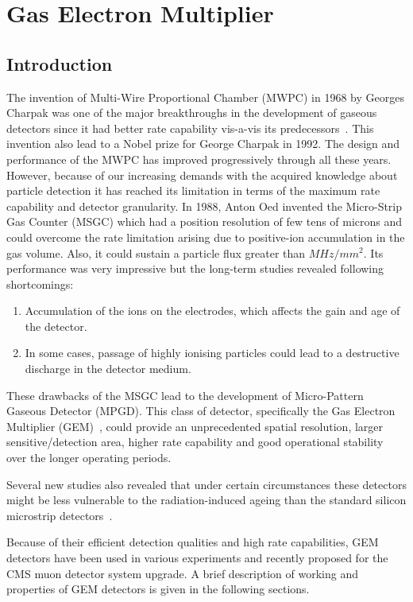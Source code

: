 \chapter{Gas Electron Multiplier} %
\label{cha:gas_electron_multiplier}

\section{Introduction} %
\label{sec:introduction}
The invention of Multi-Wire Proportional Chamber (MWPC) in 1968 by Georges Charpak was one of the major breakthroughs in the development of gaseous detectors since it had better rate capability vis-a-vis its predecessors~\cite{Charpak1968}. 
This invention also lead to a Nobel prize for George Charpak in 1992. 
The design and performance of the MWPC has improved progressively through all these years.
However, because of our increasing demands with the acquired knowledge about particle detection it has reached its limitation in terms of the maximum rate capability and detector granularity.
In 1988, Anton Oed invented the Micro-Strip Gas Counter (MSGC) which had a position resolution of few tens of microns and could overcome the rate limitation arising due to positive-ion accumulation in the gas volume. 
Also, it could sustain a particle flux greater than $MHz/mm^2$. Its performance was very impressive but the long-term studies revealed following shortcomings:
\begin{enumerate}
	\item Accumulation of the ions on the electrodes, which affects the gain and age of the detector.
	\item In some cases, passage of highly ionising particles could lead to a destructive discharge in the detector medium.
\end{enumerate}
These drawbacks of the MSGC lead to the development of Micro-Pattern Gaseous Detector (MPGD). This class of detector, specifically the Gas Electron Multiplier (GEM)~\cite{Sauli1997,Sauli1999,detector:1732870}, could provide an unprecedented spatial resolution, larger sensitive/detection area, higher rate capability and good operational stability over the longer operating periods.

Several new studies also revealed that under certain circumstances these detectors might be less vulnerable to the radiation-induced ageing than the standard silicon microstrip detectors~\cite{TITOV2004,Titov2002}.

Because of their efficient detection qualities and high rate capabilities, GEM detectors have been used in various experiments and recently proposed for the CMS muon detector system upgrade. A brief description of working and properties of GEM detectors is given in the following sections.

